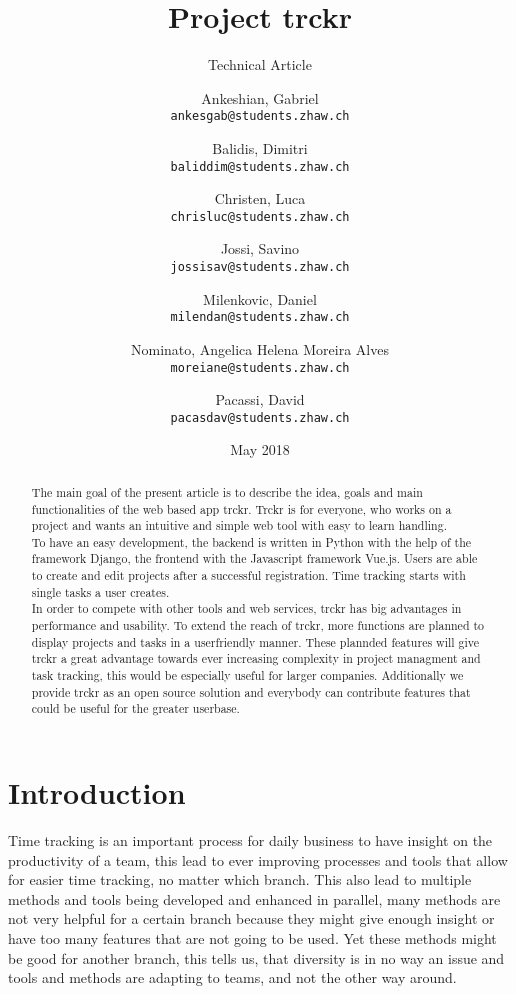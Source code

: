 \documentclass[a4paper, 12pt, headsepline]{scrartcl}
\title{Project trckr}
\subtitle{Technical Article}
\date{May 2018}
\author{
Ankeshian, Gabriel\\
\texttt{ankesgab@students.zhaw.ch}
\and
Balidis, Dimitri\\
\texttt{baliddim@students.zhaw.ch}
\and
Christen, Luca\\
\texttt{chrisluc@students.zhaw.ch}
\and
Jossi, Savino\\
\texttt{jossisav@students.zhaw.ch}
\and
Milenkovic, Daniel\\
\texttt{milendan@students.zhaw.ch}
\and
Nominato, Angelica Helena Moreira Alves\\
\texttt{moreiane@students.zhaw.ch}
\and
Pacassi, David\\
\texttt{pacasdav@students.zhaw.ch}}
\begin{document}
\maketitle
\pagebreak

\begin{abstract}
The main goal of the present article is to describe the idea, goals and main functionalities of the web based app trckr. Trckr is for everyone,
who works on a project and wants an intuitive and simple web tool with easy to learn handling.\\
To have an easy development, the backend is written in Python with the help of the framework Django, the frontend with the Javascript
framework Vue.js. Users are able to create and edit projects after a successful registration. Time tracking starts with single tasks
a user creates.\\
In order to compete with other tools and web services, trckr has big advantages in performance and usability. To extend the reach of trckr, more
functions are planned to display projects and tasks in a userfriendly manner. These plannded features will give trckr a great advantage towards ever 
increasing complexity in project managment and task tracking, this would be especially useful for larger companies. Additionally we provide trckr
as an open source solution and everybody can contribute features that could be useful for the greater userbase.

\end{abstract}

\pagebreak


\tableofcontents

\pagebreak

\section{Introduction}
Time tracking is an important process for daily business to have insight on the productivity of a team, this lead to ever improving processes and tools
that allow for easier time tracking, no matter which branch. This also lead to multiple methods and tools being developed and enhanced in parallel,
many methods are not very helpful for a certain branch because they might give enough insight or have too many features that are not going to be used.
Yet these methods might be good for another branch, this tells us, that diversity is in no way an issue and tools and methods are adapting to teams,
and not the other way around.
\end{document}
